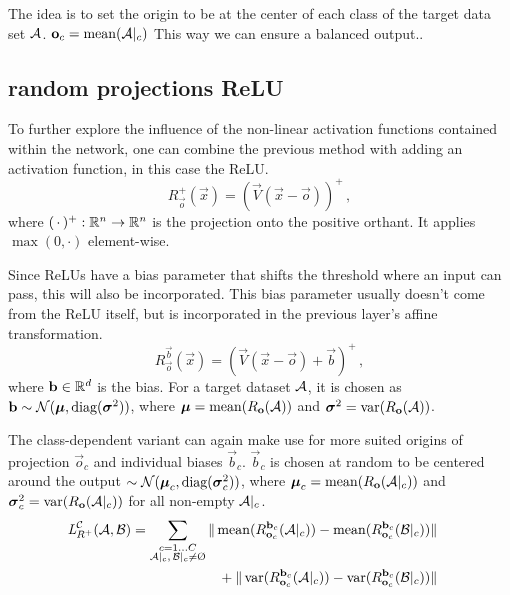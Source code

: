 The idea is to set the origin to be at the center of each class of the target data set $\set A$. $\vec o_c = \mean ({\set A|_c})$
This way we can ensure a balanced output..



\subsection{random projections ReLU}
To further explore the influence of the non-linear activation functions contained within the network,
one can combine the previous method with adding an activation function, in this case the ReLU.
% 
\[
    R_{\vec o}^+ (\vec x) = (\vec V (\vec x - \vec o))^+ \,,
\]
where $(\,\cdot\,)^+ :\R^n \to \R^n$ is the projection onto the positive orthant. It applies $\max(0, \cdot)$ element-wise.

Since ReLUs have a bias parameter that shifts the threshold where an input can pass, this will also be incorporated.
This bias parameter usually doesn't come from the ReLU itself, but is incorporated in the previous layer's affine transformation.
\[
    R_{\vec o}^{\vec b} (\vec x) = (\vec V (\vec x - \vec o) + \vec b)^+ \,,
\]
where $\vec b \in \R^d$ is the bias. For a target dataset $\set A$, it is chosen as $\vec b \sim \mathcal N(\boldsymbol \mu, \textnormal{diag}(\boldsymbol \sigma ^2))$, 
where $\boldsymbol \mu = \mean ({R_{\vec o}(\set A)})$ and $\boldsymbol \sigma ^2 = \var ({R_{\vec o}(\set A)})$.

The class-dependent variant can again make use for more suited origins of projection $\vec o_c$ and individual biases $\vec b_c$.
$\vec b_c$ is chosen at random to be centered around the output $\sim \mathcal N(\boldsymbol \mu_c, \textnormal{diag}(\boldsymbol \sigma _c^2))$, 
where $\boldsymbol \mu_c = \mean ({R_{\vec o}(\set A|_c)})$ and $\boldsymbol \sigma_c ^2 = \var ({R_{\vec o}(\set A|_c)})$ for all non-empty $\set A|_c$.
% 
\begin{align*}
    \loss _{R^+} ^{\mathcal C} (\set A, \set B) &=
    \begin{aligned}[t]
        \sum _{\substack{c = 1 \dots C \\ \set A|_c ,\, \set B|_c \neq \emptyset}} 
        \|\mean ({R_{\vec o_c}^{\vec b_c} (\set A|_c)}) - \mean ({R_{\vec o_c}^{\vec b_c} (\set B|_c)})\| \\
        {} + \|\var ({R_{\vec o_c}^{\vec b_c} (\set A|_c)}) - \var ({R_{\vec o_c}^{\vec b_c} (\set B|_c)}) \| 
    \end{aligned}
\end{align*}


